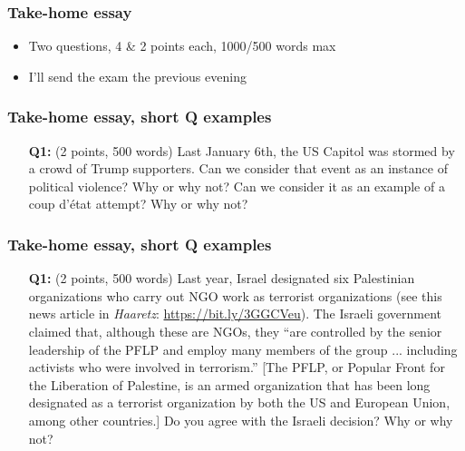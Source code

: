 \documentclass[aspectratio=43]{beamer}
\begin{document}
\begin{frame}
\frametitle{\textbf{Take-home essay}}
\centering

\begin{itemize}
  \item Two questions, 4 \& 2 points each, 1000/500 words max
  \item I'll send the exam the previous evening
\end{itemize}

\end{frame}

\begin{frame}
\frametitle{Take-home essay, short Q examples}
\centering

\begin{itemize}
  \item[\textbf{Q1:}] (2 points, 500 words) Last January 6th, the US Capitol was stormed by a crowd of Trump supporters. Can we consider that event as an instance of political violence? Why or why not? Can we consider it as an example of a coup d'état attempt? Why or why not?
\end{itemize}

\end{frame}

\begin{frame}
\frametitle{Take-home essay, short Q examples}
\centering

\begin{itemize}
  \item[\textbf{Q1:}] (2 points, 500 words) Last year, Israel designated six Palestinian organizations who carry out NGO work as terrorist organizations (see this news article in \textit{Haaretz}: \url{https://bit.ly/3GGCVeu}). The Israeli government claimed that, although these are NGOs, they ``are controlled by the senior leadership of the PFLP and employ many members of the group ... including activists who were involved in terrorism.'' [The PFLP, or Popular Front for the Liberation of Palestine, is an armed organization that has been long designated as a terrorist organization by both the US and European Union, among other countries.] Do you agree with the Israeli decision? Why or why not?
\end{itemize}

\end{frame}
\end{document}
